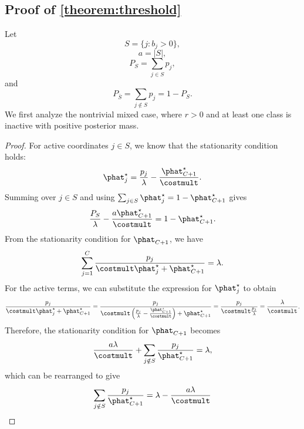 \vspace{5\baselineskip}




\subsection{Proof of \cref{theorem:threshold}}
\label{sec:proof_threshold}
\theoremThreshold*

Let
\[ S=\{j:b_j>0\},\]
\[a=|S|,\]
\[P_S=\sum_{j\in S}p_j,\]
and
\[P_{\bar{S}}=\sum_{j\notin S}p_j=1-P_S. \]
We first analyze the nontrivial mixed case, where $r>0$ and at least one class is inactive with positive posterior mass.

\begin{proof}
    For active coordinates $j\in S$, we know that the stationarity condition holds:
    \begin{align*}
        \phat^{\star}_j
        =
        \frac{p_j}{\lambda}
        -
        \frac{\phat^{\star}_{C+1}}{\costmult}.
    \end{align*}
    Summing over $j\in S$ and using $\sum_{j\in S} \phat^{\star}_{j} = 1-\phat^{\star}_{C+1}$ gives
    \begin{align*}
        \frac{P_S}{\lambda}-\frac{a \phat^{\star}_{C+1}}{\costmult}=1-\phat^{\star}_{C+1}.
    \end{align*}
    From the stationarity condition for $\phat_{C+1}$, we have
    \begin{align*}
        \sum_{j=1}^{C}
        \frac{p_j}
        {\costmult \phat^{\star}_j+\phat^{\star}_{C+1}}
        =
        \lambda.
    \end{align*}
    For the active terms, we can substitute the expression for $\phat^{\star}_j$ to obtain
    \begin{align*}
        \frac{p_j}{\costmult \phat^{\star}_j+\phat^{\star}_{C+1}}
        =
        \frac{p_j}{\costmult\left(\frac{p_j}{\lambda}-\frac{\phat^{\star}_{C+1}}{\costmult}\right)+\phat^{\star}_{C+1}}
        =
        \frac{p_j}{\costmult\frac{p_j}{\lambda}}
        =
        \frac{\lambda}{\costmult}.
    \end{align*}
    Therefore, the stationarity condition for $\phat_{C+1}$ becomes
    \begin{align*}
        \frac{a\lambda}{\costmult}+\sum_{j\notin S}\frac{p_j}{\phat^{\star}_{C+1}}=\lambda,
    \end{align*}
    which can be rearranged to give
    \begin{align*}
        \sum_{j\notin S}\frac{p_j}{\phat^{\star}_{C+1}}=\lambda-\frac{a\lambda}{\costmult}

\end{align*}
\end{proof}
